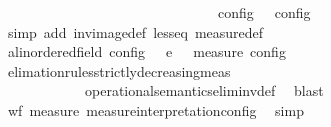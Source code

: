 \begin{isabellebody}
\ \ \ \ \ \ \ \ \ \ \ \ \ \ \ \ \ \ \ \ \ \ \ \ \ \ \ \ \ \ \ {\isasymmu}\isactrlsub c\isactrlsub o\isactrlsub n\isactrlsub f\isactrlsub i\isactrlsub g\ {\isasymS}\ {\isacharless}\ {\isasymmu}\isactrlsub c\isactrlsub o\isactrlsub n\isactrlsub f\isactrlsub i\isactrlsub g\ {\isasymS}\isanewline
\ \ \ \ \ \ \isamarkupfalse%
\ {\isacharparenleft}simp\ add{\isacharcolon}\ inv{\isacharunderscore}image{\isacharunderscore}def\ less{\isacharunderscore}eq\ measure{\isacharunderscore}def{\isacharparenright}\isanewline
\ \ \ \ \isamarkupfalse%
\ {\isacartoucheopen}{\isacharbraceleft}{\isacharparenleft}{\isacharparenleft}{\isasymS}a{\isacharcolon}{\isacharcolon}linordered{\isacharunderscore}field\ config{\isacharparenright}{\isacharcomma}\ {\isasymS}\ {\isasymS}\ {\isasymhookrightarrow}\isactrlsub e\isactrlsup {\isasymleftarrow}\ {\isasymS}\ {\isasymsubseteq}\ {\isacharparenleft}measure\ {\isasymmu}\isactrlsub c\isactrlsub o\isactrlsub n\isactrlsub f\isactrlsub i\isactrlsub g{\isacharparenright}{\isacartoucheclose}\isanewline
\ \ \ \ \ \ \isamarkupfalse%
\ elimation{\isacharunderscore}rules{\isacharunderscore}strictly{\isacharunderscore}decreasing{\isacharunderscore}meas{\isacharprime}\isanewline
\ \ \ \ \ \ \ \ \ \ \ \ operational{\isacharunderscore}semantics{\isacharunderscore}elim{\isacharunderscore}inv{\isacharunderscore}def\ \isamarkupfalse%
\ blast\isanewline
\ \ \isamarkupfalse%
\isanewline
\ \ \ \ \isamarkupfalse%
\ {\isacartoucheopen}wf\ {\isacharparenleft}measure\ measure{\isacharunderscore}interpretation{\isacharunderscore}config{\isacharparenright}{\isacartoucheclose}\ \isamarkupfalse%
\ simp\isanewline
\ \ \isamarkupfalse%
\isanewline
{}\isamarkupfalse%
%
\endisatagproof
{\isafoldproof}%
%
\isadelimproof
\isanewline
%
\endisadelimproof
\isanewline
%
\isadelimtheory
\isanewline
%
\endisadelimtheory
%
\isatagtheory
{}\isamarkupfalse%
%
\endisatagtheory
{\isafoldtheory}%
%
\isadelimtheory
%
\endisadelimtheory
%
\end{isabellebody}%
\endinput
